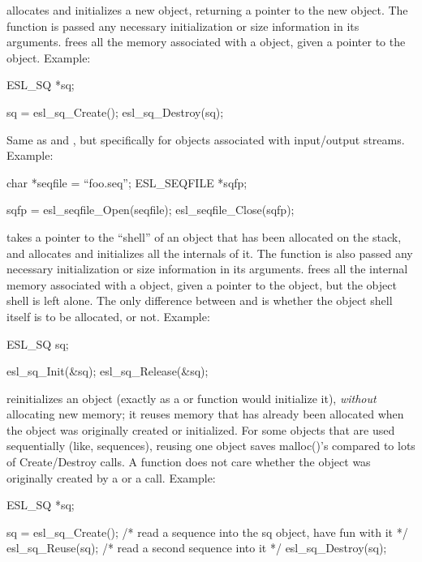 \documentclass[11pt]{article}
\begin{document}
\begin{sreitems}{}
\item [\cfunc{Create,Destroy}] 
   allocates and initializes a new 
  object, returning a pointer to the new
  object. The  function is passed any necessary
  initialization or size information in its arguments.
   frees all the memory associated
  with a  object,  given a pointer to the object.
  Example:

\begin{cchunk}
ESL_SQ *sq;

sq = esl_sq_Create();
esl_sq_Destroy(sq);
\end{cchunk}
  
\item [\cfunc{Open,Close}] 
  Same as  and , but specifically for
  objects associated with input/output streams. Example:

\begin{cchunk}
char        *seqfile = ``foo.seq'';
ESL_SEQFILE *sqfp;

sqfp = esl_seqfile_Open(seqfile);
esl_seqfile_Close(sqfp);
\end{cchunk}

\item [\cfunc{Init,Release}]
   takes a pointer to the ``shell'' of an
   object that has been allocated on the stack, and
  allocates and initializes all the internals of it. The
   function is also passed any necessary initialization or
  size information in its arguments.  
  frees all the internal memory associated with a  object,
  given a pointer to the object, but the object shell is left alone.
  The only difference between  and
   is whether the object shell itself is to be
  allocated, or not. Example:

\begin{cchunk}
ESL_SQ  sq;

esl_sq_Init(&sq);
esl_sq_Release(&sq);
\end{cchunk}


\item [\cfunc{Reuse}] 
    reinitializes an object (exactly as a
    or  function would initialize it), \emph{without}
   allocating new memory; it reuses memory that has
   already been allocated when the object was originally created or
   initialized. For some objects that are used sequentially (like,
   sequences), reusing one object saves malloc()'s compared to
   lots of Create/Destroy calls. A  function does not
   care whether the object was originally created by a 
   or a  call. Example:

\begin{cchunk}
ESL_SQ *sq;

sq = esl_sq_Create();
  /* read a sequence into the sq object, have fun with it */
esl_sq_Reuse(sq);
  /* read a second sequence into it */
esl_sq_Destroy(sq);
\end{cchunk}



\end{sreitems}
\end{document}
